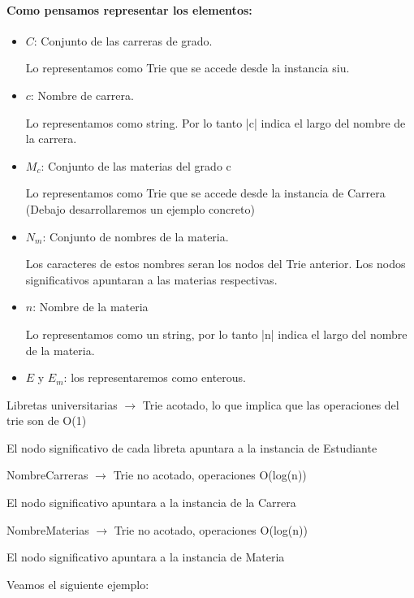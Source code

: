 \documentclass[a4paper,10pt]{article}
\begin{document}
\paragraph*{Como pensamos representar los elementos:}

\begin{itemize}
    \item $C$: Conjunto de las carreras de grado.


          Lo representamos como Trie que se accede desde la instancia siu.
    \item $c$: Nombre de carrera.


          Lo representamos como string. Por lo tanto |c| indica el largo del nombre de la carrera.
    \item $M_c$: Conjunto de las materias del grado c

          Lo representamos como Trie que se accede desde la instancia de Carrera (Debajo desarrollaremos un ejemplo concreto)
    \item $N_m$: Conjunto de nombres de la materia.

          Los caracteres de estos nombres seran los nodos del Trie anterior. Los nodos significativos apuntaran a las materias respectivas.
    \item $n$: Nombre de la materia

          Lo representamos como un string, por lo tanto |n| indica el largo del nombre de la materia.
    \item $E$ y $E_m$: los representaremos como enterous.
\end{itemize}
\salto{\baselineskip}
Libretas universitarias $\rightarrow$ Trie acotado, lo que implica que las operaciones del trie son de O(1)

{\small El nodo significativo de cada libreta apuntara a la instancia de Estudiante}

\salto{\baselineskip}

NombreCarreras $\rightarrow$ Trie no acotado, operaciones O(log(n))

{\small El nodo significativo apuntara a la instancia de la Carrera}

\salto{\baselineskip}

NombreMaterias $\rightarrow$ Trie no acotado, operaciones O(log(n))

{\small El nodo significativo apuntara a la instancia de Materia}

\salto{\baselineskip}

Veamos el siguiente ejemplo:
\salto{\baselineskip}
\end{document}
